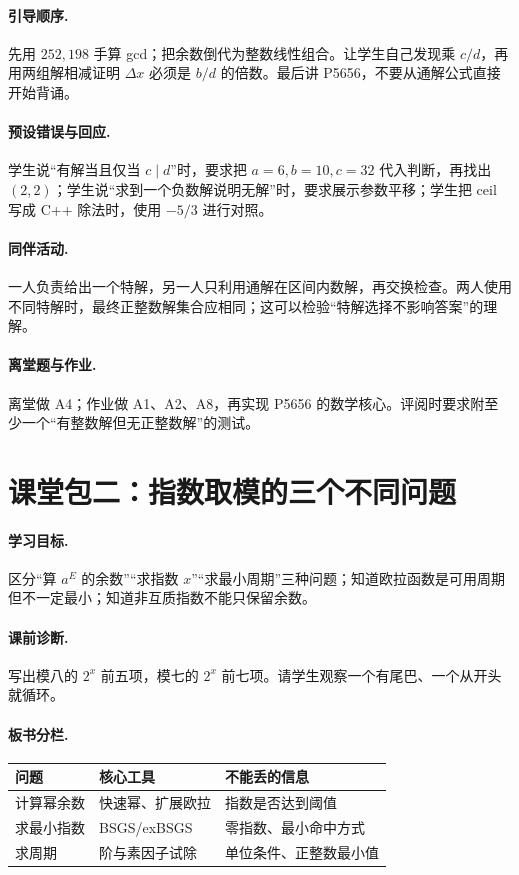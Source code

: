 \documentclass[UTF8,a4paper,11pt,oneside,openany,fontset=fandol]{ctexbook}
\theoremstyle{definition}
\begin{document}
\paragraph{引导顺序.}
先用 $252,198$ 手算 gcd；把余数倒代为整数线性组合。让学生自己发现乘 $c/d$，再用两组解相减证明 $\Delta x$ 必须是 $b/d$ 的倍数。最后讲 P5656，不要从通解公式直接开始背诵。
\paragraph{预设错误与回应.}
学生说“有解当且仅当 $c\mid d$”时，要求把 $a=6,b=10,c=32$ 代入判断，再找出 $(2,2)$；学生说“求到一个负数解说明无解”时，要求展示参数平移；学生把 ceil 写成 C++ 除法时，使用 $-5/3$ 进行对照。
\paragraph{同伴活动.} 一人负责给出一个特解，另一人只利用通解在区间内数解，再交换检查。两人使用不同特解时，最终正整数解集合应相同；这可以检验“特解选择不影响答案”的理解。
\paragraph{离堂题与作业.} 离堂做 A4；作业做 A1、A2、A8，再实现 P5656 的数学核心。评阅时要求附至少一个“有整数解但无正整数解”的测试。

\section{课堂包二：指数取模的三个不同问题}
\paragraph{学习目标.} 区分“算 $a^E$ 的余数”“求指数 $x$”“求最小周期”三种问题；知道欧拉函数是可用周期但不一定最小；知道非互质指数不能只保留余数。
\paragraph{课前诊断.} 写出模八的 $2^x$ 前五项，模七的 $2^x$ 前七项。请学生观察一个有尾巴、一个从开头就循环。
\paragraph{板书分栏.}
\begin{center}
\begin{tabular}{lll}
\toprule
问题 & 核心工具 & 不能丢的信息\\\midrule
计算幂余数 & 快速幂、扩展欧拉 & 指数是否达到阈值\\
求最小指数 & BSGS/exBSGS & 零指数、最小命中方式\\
求周期 & 阶与素因子试除 & 单位条件、正整数最小值\\\bottomrule
\end{tabular}
\end{center}
\end{document}
